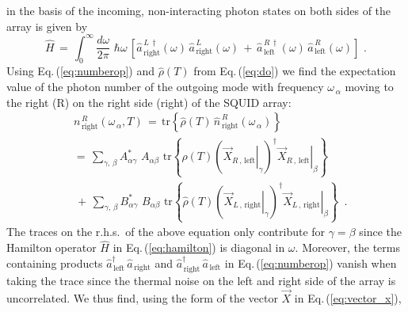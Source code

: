 in the basis of the incoming, non-interacting photon states 
on both sides of the array is given by
%
\begin{equation} \label{eq:hamilton}
\hat{H} \, = \, \int_{0}^{\infty} \frac{d{\omega}}{2 \pi} \, \, \hbar \omega \, 
\left[
\hat{a}_{\,\text{right}}^{\,L\,\dagger}(\omega) \, 
\hat{a}_{\,\text{right}}^{\,L}(\omega) \, + \,
\hat{a}_{\,\text{left}}^{\,R\,\dagger}(\omega) \, 
\hat{a}_{\,\text{left}}^{\,R}(\omega) 
\right] \, \, .
\end{equation}
%
Using Eq.\,(\ref{eq:numberop}) and $\hat{\rho}(T)$ from Eq.\,(\ref{eq:do}) we find 
the expectation value of the photon number of the outgoing mode with frequency 
$\omega_{\,\alpha}$ moving to the right (R) on the right side (right) of the SQUID array:
%
\begin{equation} \label{eq:numberthermal} 
\begin{split}
& n_{\,\text{right}}^{\,R}(\omega_{\,\alpha}, T) \, = \, 
\text{tr} \left\{ \hat{\rho}(T) \, \hat{n}_{\,\text{right}}^{\,R}(\omega_{\,\alpha}) \right\} \\[3mm]
& = \, \sum\limits_{\gamma, \, \beta} A_{\alpha \gamma}^* \, \, A_{\alpha \beta}  \, \,
\text{tr}  \left\{ \hat{\rho}(T) 
\left( \left. \vec{X}_{R\,,\,\text{left}} \right|_{\gamma} \right)^{\dagger}
\left. \vec{X}_{R\,,\,\text{left}} \right|_{\beta} \right\} \\[3mm]
& \, + \, \sum\limits_{\gamma, \, \beta} B_{\alpha \gamma}^* \, \, B_{\alpha \beta}  \, \, 
\text{tr}  \left\{ \hat{\rho}(T) 
\left( \left. \vec{X}_{L\,,\,\text{right}} \right|_{\gamma} \right)^{\dagger}
\left. \vec{X}_{L\,,\,\text{right}} \right|_{\beta} \right\}
\, \, \, .
\end{split}
\end{equation}
% 
The traces on the r.h.s.~of the above equation 
only contribute for $\gamma = \beta$ since the Hamilton operator $\hat{H}$ in Eq.\,(\ref{eq:hamilton}) 
is diagonal in $\omega$. Moreover, the terms containing products 
$\hat{a}_{\,\text{left}}^{\dagger} \, \hat{a}_{\,\text{right}}$ and 
$\hat{a}_{\,\text{right}}^{\dagger} \, \hat{a}_{\,\text{left}}$ in Eq.\,(\ref{eq:numberop})
vanish when taking the trace since the thermal noise on the left and right side of the array
is uncorrelated. We thus find, using the form of the vector 
$\vec{X}$ in Eq.\,(\ref{eq:vector_x}),
%
